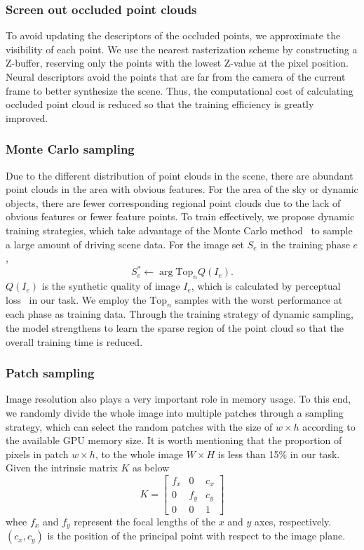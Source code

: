 \documentclass[sigconf]{acmart}
\begin{document}
\subsubsection{Screen out occluded point clouds}
To avoid updating the descriptors of the occluded points, we approximate the visibility of each point. We use the nearest rasterization scheme by constructing a Z-buffer, reserving only the points with the lowest Z-value at the pixel position. Neural descriptors avoid the points that are far from the camera of the current frame to better synthesize the scene. Thus, the computational cost of calculating occluded point cloud is reduced so that the training efficiency is greatly improved.

\subsubsection{Monte Carlo sampling}

Due to the different distribution of point clouds in the scene, there are abundant point clouds in the area with obvious features. For the area of the sky or dynamic objects, there are fewer corresponding regional point clouds due to the lack of obvious features or fewer feature points. To train effectively, we propose dynamic training strategies, which take advantage of the Monte Carlo method~\cite{shapiro2003monte} to sample a large amount of driving scene data. For the image set $S_e$ in the training phase $e$,
\begin{equation}
  S_{e}^{*} \leftarrow \arg \mathrm{Top}_{n} Q(I_{e}).
\end{equation}
$Q(I_{e})$ is the synthetic quality of image $I_{e}$, which is calculated by perceptual loss~\cite{johnson2016perceptual} in our task. We employ the $\mathrm{Top}_{n}$ samples with the worst performance at each phase as training data. Through the training strategy of dynamic sampling, the model strengthens to learn the sparse region of the point cloud so that the overall training time is reduced.
  
\subsubsection{Patch sampling} 
Image resolution also plays a very important role in memory usage. To this end, we randomly divide the whole image into multiple patches through a sampling strategy, which can select the random patches with the size of $w\times h$ according to the available GPU memory size. It is worth mentioning that the proportion of pixels in patch $w\times h$, to the whole image $W\times H$ is less than 15\% in our task. Given the intrinsic matrix $K$ as below  
$$
K=\left[\begin{array}{ccc}
f_{x} & 0 & c_{x} \\
0 & f_{y} & c_{y} \\
0 & 0 & 1
\end{array}\right]
$$
whee $f_x$ and $f_y$ represent the focal lengths of the $x$ and $y$ axes, respectively. $(c_{x}, c_{y})$ is the position of the principal point with respect to the image plane. 
\end{document}
